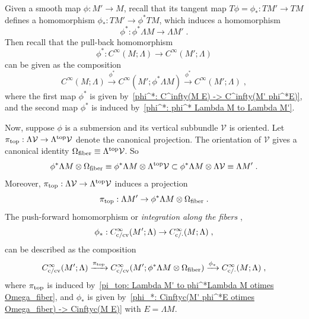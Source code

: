 \documentclass{memo-l}
\theoremstyle{plain}
\theoremstyle{definition}
\theoremstyle{remark}
\newcommand{\VV}{\mathcal{V}}
\newcommand{\fiber}{{\text{\rm fiber}}}
\newcommand{\topd}{{\text{\rm top}}}
\newcommand{\co}{{\text{\rm c}}}
\newcommand{\cv}{{\text{\rm cv}}}
\numberwithin{section}{chapter}
\numberwithin{equation}{section}%
\begin{document}
Given a smooth map $\phi:M'\to M$, recall that its tangent map $T\phi=\phi_*:TM'\to TM$ defines a homomorphism $\phi_*:TM'\to \phi^*TM$, which induces a homomorphism
\begin{equation}\label{phi^*: phi^* Lambda M to Lambda M'}
\phi^*:\phi^*\Lambda M\to\Lambda M'\;.
\end{equation}
Then recall that the pull-back homomorphism
\begin{equation}\label{phi^*: C^infty(M Lambda) to C^infty(M' Lambda)}
\phi^*:C^\infty(M;\Lambda)\to C^\infty(M';\Lambda)
\end{equation}
can be given as the composition
\begin{equation}\label{composition -pull-back - diff forms}
C^\infty(M;\Lambda)\xrightarrow{\phi^*}C^\infty(M';\phi^*\Lambda M)\xrightarrow{\phi^*}C^\infty(M';\Lambda)\;,
\end{equation}
where the first map $\phi^*$ is given by~\eqref{phi^*: C^infty(M E) -> C^infty(M' phi^*E)}, and the second map $\phi^*$ is induced by~\eqref{phi^*: phi^* Lambda M to Lambda M'}.

Now, suppose $\phi$ is a submersion and its vertical subbundle $\VV$ is oriented. Let $\pi_\topd:\Lambda\VV\to\Lambda^\topd\VV$ denote the canonical projection. The orientation of $\VV$ gives a canonical identity $\Omega_\fiber\equiv\Lambda^\topd\VV$. So
\[
\phi^*\Lambda M\otimes\Omega_\fiber\equiv\phi^*\Lambda M\otimes\Lambda^\topd\VV\subset\phi^*\Lambda M\otimes\Lambda\VV\equiv\Lambda M'\;.
\]
Moreover, $\pi_\topd:\Lambda\VV\to\Lambda^\topd\VV$ induces a projection
\begin{equation}\label{pi_top: Lambda M' to phi^*Lambda M otimes Omega_fiber}
\pi_\topd:\Lambda M'\to\phi^*\Lambda M\otimes\Omega_\fiber\;.
\end{equation}
The push-forward homomorphism or \emph{integration along the fibers} \cite[Section~I.6]{BottTu1982},
\begin{equation}\label{phi_*: C^infty_c/cv(M' Lambda) to C^infty_c/.(M Lambda)}
\phi_*:C^\infty_{\co/\cv}(M';\Lambda)\to C^\infty_{\co/{\cdot}}(M;\Lambda)\;,
\end{equation}
can be described as the composition
\begin{equation}\label{composition -push-forward - diff forms}
C^\infty_{\co/\cv}(M';\Lambda)\xrightarrow{\pi_\topd}C^\infty_{\co/\cv}(M';\phi^*\Lambda M\otimes\Omega_\fiber)
\xrightarrow{\phi_*}C^\infty_{\co/{\cdot}}(M;\Lambda)\;,
\end{equation}
where $\pi_\topd$ is induced by~\eqref{pi_top: Lambda M' to phi^*Lambda M otimes Omega_fiber}, and $\phi_*$ is given by~\eqref{phi_*: Cinftyc(M' phi^*E otimes Omega_fiber) -> Cinftyc(M E)} with $E=\Lambda M$.
\end{document}
